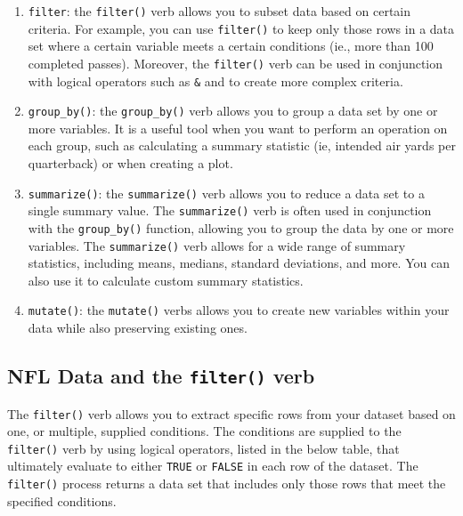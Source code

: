 \documentclass[
  letterpaper,
]{krantz}
\providecommand{\tightlist}{%
  \setlength{\itemsep}{0pt}\setlength{\parskip}{0pt}}\usepackage{longtable,booktabs,array}
\begin{document}
\begin{enumerate}
\def\labelenumi{\arabic{enumi}.}
\tightlist
\item
  \texttt{filter}: the \texttt{filter()} verb allows you to subset data
  based on certain criteria. For example, you can use \texttt{filter()}
  to keep only those rows in a data set where a certain variable meets a
  certain conditions (ie., more than 100 completed passes). Moreover,
  the \texttt{filter()} verb can be used in conjunction with logical
  operators such as \texttt{\&} and \texttt{\textbar{}} to create more
  complex criteria.
\item
  \texttt{group\_by()}: the \texttt{group\_by()} verb allows you to
  group a data set by one or more variables. It is a useful tool when
  you want to perform an operation on each group, such as calculating a
  summary statistic (ie, intended air yards per quarterback) or when
  creating a plot.
\item
  \texttt{summarize()}: the \texttt{summarize()} verb allows you to
  reduce a data set to a single summary value. The \texttt{summarize()}
  verb is often used in conjunction with the \texttt{group\_by()}
  function, allowing you to group the data by one or more variables. The
  \texttt{summarize()} verb allows for a wide range of summary
  statistics, including means, medians, standard deviations, and more.
  You can also use it to calculate custom summary statistics.
\item
  \texttt{mutate()}: the \texttt{mutate()} verbs allows you to create
  new variables within your data while also preserving existing ones.
\end{enumerate}

\hypertarget{nfl-data-and-the-filter-verb}{%
\subsection{\texorpdfstring{NFL Data and the \texttt{filter()}
verb}{NFL Data and the filter() verb}}\label{nfl-data-and-the-filter-verb}}

The \texttt{filter()} verb allows you to extract specific rows from your
dataset based on one, or multiple, supplied conditions. The conditions
are supplied to the \texttt{filter()} verb by using logical operators,
listed in the below table, that ultimately evaluate to either
\texttt{TRUE} or \texttt{FALSE} in each row of the dataset. The
\texttt{filter()} process returns a data set that includes only those
rows that meet the specified conditions.
\end{document}
